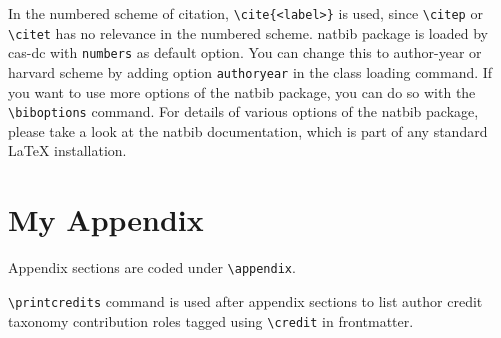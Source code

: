 \documentclass[a4paper,fleqn]{cas-dc}
\begin{document}
In the numbered scheme of citation, \verb+\cite{<label>}+ is used,
since \verb+\citep+ or \verb+\citet+ has no relevance in the numbered
scheme.  {natbib} package is loaded by {cas-dc} with
\verb+numbers+ as default option.  You can change this to author-year
or harvard scheme by adding option \verb+authoryear+ in the class
loading command.  If you want to use more options of the {natbib}
package, you can do so with the \verb+\biboptions+ command.  For
details of various options of the {natbib} package, please take a
look at the {natbib} documentation, which is part of any standard
\LaTeX{} installation.

\appendix
\section{My Appendix}
Appendix sections are coded under \verb+\appendix+.

\verb+\printcredits+ command is used after appendix sections to list 
author credit taxonomy contribution roles tagged using \verb+\credit+ 
in frontmatter.

\printcredits

%


%




%
%
\end{document}
